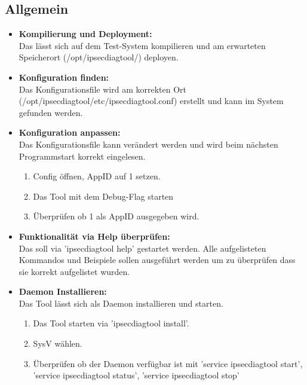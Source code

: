 \subsection{Allgemein}
\begin{itemize}
\item[\Square] \textbf{Kompilierung und Deployment:}\\
Das \tool lässt sich auf dem Test-System kompilieren und am erwarteten Speicherort (/opt/ipsecdiagtool/) deployen.
			   
\item[\Square] \textbf{Konfiguration finden:} \\
Das Konfigurationsfile wird am korrekten Ort (/opt/ipsecdiagtool/etc/ipsecdiagtool.conf) erstellt und kann im System gefunden werden. 
			   
\item[\Square] \textbf{Konfiguration anpassen:} \\
Das Konfigurationsfile kann verändert werden und wird beim nächsten Programmstart korrekt eingelesen.
\begin{enumerate} \itemsep1pt \parskip0pt 
  \item Config öffnen, AppID auf 1 setzen.
  \item Das Tool mit dem Debug-Flag starten
  \item Überprüfen ob 1 als AppID ausgegeben wird.
\end{enumerate}

\item[\Square] \textbf{Funktionalität via Help überprüfen:} \\
Das \tool soll via 'ipsecdiagtool help' gestartet werden. Alle aufgelisteten Kommandos und Beispiele sollen ausgeführt werden um zu überprüfen dass sie korrekt aufgelistet wurden.

\item[\Square] \textbf{Daemon Installieren:} \\
Das Tool lässt sich als Daemon installieren und starten.
\begin{enumerate} \itemsep1pt \parskip0pt 
  \item Das Tool starten via 'ipsecdiagtool install'.
  \item SysV wählen.
  \item Überprüfen ob der Daemon verfügbar ist mit 'service ipsecdiagtool start', 'service ipsecdiagtool status', 'service ipsecdiagtool stop'
\end{enumerate}


\end{itemize}
